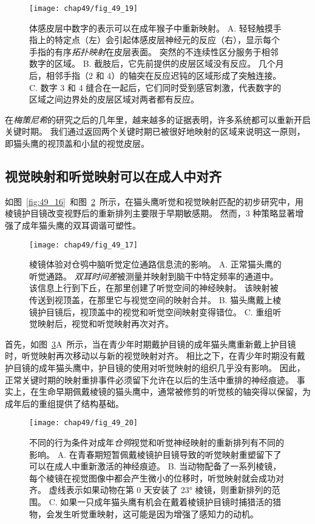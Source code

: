 \begin{figure}[htbp]
	\centering
	\texttt{[image: chap49/fig\_49\_19]}
	\caption{体感皮层中数字的表示可以在成年猴子中重新映射\cite{merzenich1984somatosensory}。
		A. 轻轻触摸手指上的特定点（左）会引起体感皮层神经元的反应（右），显示每个手指的有序\textit{拓扑映射}在皮层表面。
		突然的不连续性区分服务于相邻数字的区域。
		B. 截肢后，它先前提供的皮层区域没有反应。
		几个月后，相邻手指（2 和 4）的轴突在反应迟钝的区域形成了突触连接。
		C. 数字 3 和 4 缝合在一起后，它们同时受到感官刺激，代表数字的区域之间边界处的皮层区域对两者都有反应。}
	\label{fig:49_19}
\end{figure}


在\textit{梅策尼希}的研究之后的几年里，越来越多的证据表明，许多系统都可以重新开启关键时期。
我们通过返回两个关键时期已被很好地映射的区域来说明这一原则，即猫头鹰的视顶盖和小鼠的视觉皮层。



\subsection{视觉映射和听觉映射可以在成人中对齐}

如图~\ref{fig:49_16}~和图~\ref{fig:49_17}~所示，在猫头鹰听觉和视觉映射匹配的初步研究中，用棱镜护目镜改变视野后的重新排列主要限于早期敏感期。
然而，3 种策略显著增强了成年猫头鹰的双耳调谐可塑性。

\begin{figure}[htbp]
	\centering
	\texttt{[image: chap49/fig\_49\_17]}
	\caption{棱镜体验对仓鸮中脑听觉定位通路信息流的影响\cite{knudsen2002instructed}。
		A. 正常猫头鹰的听觉通路。
		\textit{双耳时间差}被测量并映射到脑干中特定频率的通道中。
		该信息上行到下丘，在那里创建了听觉空间的神经映射。
		该映射被传送到视顶盖，在那里它与视觉空间的映射合并。
		B. 猫头鹰戴上棱镜护目镜后，视顶盖中的视觉和听觉空间映射变得错位。
		C. 重组听觉映射后，视觉和听觉映射再次对齐。}
	\label{fig:49_17}
\end{figure}


首先，如图~\ref{fig:49_20}A~所示，当在青少年时期戴护目镜的成年猫头鹰重新戴上护目镜时，听觉映射再次移动以与新的视觉映射对齐。
相比之下，在青少年时期没有戴护目镜的成年猫头鹰中，护目镜的使用对听觉映射的组织几乎没有影响。
因此，正常关键时期的映射重排事件必须留下允许在以后的生活中重排的神经痕迹。
事实上，在生命早期佩戴棱镜的猫头鹰中，通常被修剪的听觉核的轴突得以保留，为成年后的重组提供了结构基础。

\begin{figure}[htbp]
	\centering
	\texttt{[image: chap49/fig\_49\_20]}
	\caption{不同的行为条件对成年\textit{仓鸮}视觉和听觉神经映射的重新排列有不同的影响。
		A. 在青春期短暂佩戴棱镜护目镜导致的听觉映射重塑留下了可以在成人中重新激活的神经痕迹。
		B. 当动物配备了一系列棱镜，每个棱镜在视觉图像中都会产生微小的位移时，听觉映射就会成功对齐。
		虚线表示如果动物在第 0 天安装了 23° 棱镜，则重新排列的范围。
		C. 如果一只成年猫头鹰有机会在戴着棱镜护目镜时捕猎活的猎物，会发生听觉重映射，这可能是因为增强了感知力的动机。}
	\label{fig:49_20}
\end{figure}


